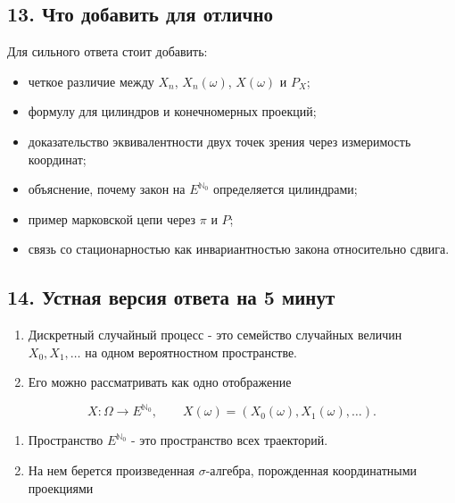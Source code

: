\documentclass[
  11pt,
  a4paper,
]{article}
\providecommand{\tightlist}{%
  \setlength{\itemsep}{0pt}\setlength{\parskip}{0pt}}
\begin{document}
\subsection{13. Что добавить для
отлично}\label{ux447ux442ux43e-ux434ux43eux431ux430ux432ux438ux442ux44c-ux434ux43bux44f-ux43eux442ux43bux438ux447ux43dux43e}

Для сильного ответа стоит добавить:

\begin{itemize}
\tightlist
\item
  четкое различие между \(X_n\), \(X_n(\omega)\), \(X(\omega)\) и
  \(P_X\);
\item
  формулу для цилиндров и конечномерных проекций;
\item
  доказательство эквивалентности двух точек зрения через измеримость
  координат;
\item
  объяснение, почему закон на \(E^{\mathbb N_0}\) определяется
  цилиндрами;
\item
  пример марковской цепи через \(\pi\) и \(P\);
\item
  связь со стационарностью как инвариантностью закона относительно
  сдвига.
\end{itemize}

\subsection{14. Устная версия ответа на 5
минут}\label{ux443ux441ux442ux43dux430ux44f-ux432ux435ux440ux441ux438ux44f-ux43eux442ux432ux435ux442ux430-ux43dux430-5-ux43cux438ux43dux443ux442}

\begin{enumerate}
\def\labelenumi{\arabic{enumi}.}
\tightlist
\item
  Дискретный случайный процесс - это семейство случайных величин
  \(X_0,X_1,\ldots\) на одном вероятностном пространстве.
\item
  Его можно рассматривать как одно отображение
\end{enumerate}

\[
X:\Omega\to E^{\mathbb N_0},
\qquad
X(\omega)=(X_0(\omega),X_1(\omega),\ldots).
\]

\begin{enumerate}
\def\labelenumi{\arabic{enumi}.}
\setcounter{enumi}{2}
\tightlist
\item
  Пространство \(E^{\mathbb N_0}\) - это пространство всех траекторий.
\item
  На нем берется произведенная \(\sigma\)-алгебра, порожденная
  координатными проекциями
\end{enumerate}
\end{document}
